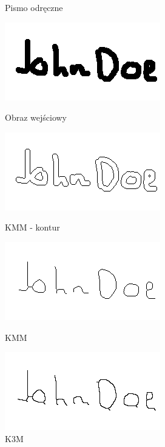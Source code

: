 \documentclass[11pt]{article}
\begin{document}
\begin{figure}[!ht] 
  \caption{Pismo odręczne}
  \label{ fig7} 
  \begin{minipage}[b]{0.5\linewidth}
    \centering
    \includegraphics[width=.5\linewidth]{../images/handwritten} 
    \caption{Obraz wejściowy} 
    \vspace{4ex}
  \end{minipage}%
  \begin{minipage}[b]{0.5\linewidth}
    \centering
    \includegraphics[width=.5\linewidth]{../samples/handwritten_kmm_contour} 
    \caption{KMM - kontur} 
    \vspace{4ex}
  \end{minipage} 
  \begin{minipage}[b]{0.5\linewidth}
    \centering
    \includegraphics[width=.5\linewidth]{../samples/handwritten_kmm} 
    \caption{KMM} 
    \vspace{4ex}
  \end{minipage}%
  \begin{minipage}[b]{0.5\linewidth}
    \centering
    \includegraphics[width=.5\linewidth]{../samples/handwritten_k3m} 
    \caption{K3M} 
    \vspace{4ex}
  \end{minipage} 
\end{figure}
\FloatBarrier
\end{document}
